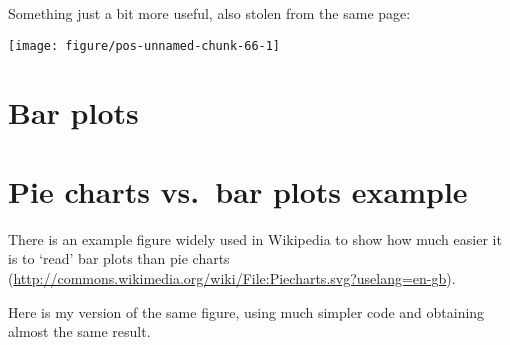 \documentclass[paper=a4,headsepline,BCOR=12mm,twoside,open=right,%
titlepage,headings=small,fontsize=10pt,index=totoc,bibliography=totoc,%
captions=tableheading,captions=nooneline]{scrbook}\usepackage{knitr}
\begin{document}
Something just a bit more useful, also stolen from the same page:

\begin{knitrout}\footnotesize
{}\color{fgcolor}\begin{kframe}
\begin{alltt}
 \hlkwb{<-} \hlstd{(}  \hlstd{(} \hlstd{=} \hlstd{(}\hlstd{),}  \hlstd{=}  \hlopt{+}
         \hlstd{(} \hlstd{=} \hlstd{)}
 \hlopt{+} \hlstd{(} \hlstd{=} \hlstd{)}
\end{alltt}
\end{kframe}

{\centering \texttt{[image: figure/pos-unnamed-chunk-66-1]} 

}



\end{knitrout}

\section{Bar plots}

\section{Pie charts vs.\ bar plots example}

There is an example figure widely used in Wikipedia to show how much easier it is to `read' bar plots than pie charts (\url{http://commons.wikimedia.org/wiki/File:Piecharts.svg?uselang=en-gb}).

Here is my \ggplot version of the same figure, using much simpler code and obtaining almost the same result.
\end{document}

